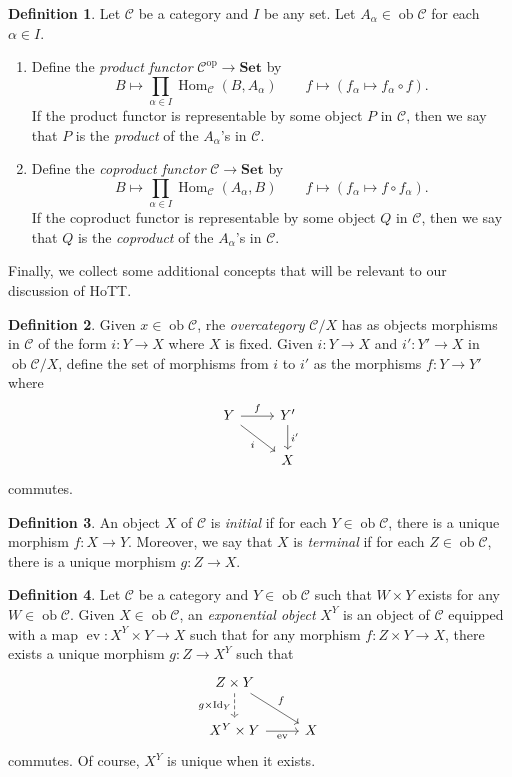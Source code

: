 \documentclass[10pt,letterpaper,cm]{nupset}
\theoremstyle{definition}
\newtheorem{definition}{Definition}[subsection]
\theoremstyle{theorem}
\theoremstyle{remark}
\newcommand{\1}{\mathbf{1}}
\renewcommand{\c}{\mathscr{C}}
\newcommand{\0}{\vec 0}
\DeclareMathOperator{\id}{Id}
\DeclareMathOperator{\op}{op}
\DeclareMathOperator{\ob}{ob}
\DeclareMathOperator{\ev}{ev}
\DeclareMathOperator{\Hom}{Hom}
\begin{document}
\begin{definition} Let $\c$ be a category and $I$ be any set. Let $A_{\alpha} \in \ob \c$ for each $\alpha \in I$.
\begin{enumerate}
\item  Define the \textit{product functor} $\c^{\op} \to \mathbf{Set}$ by $$B \mapsto \prod_{\alpha \in I}\Hom_{\c}(B, A_{\alpha}) \quad \quad f \mapsto (f_{\alpha} \mapsto f_{\alpha} \circ f).$$ If the product functor is representable by some object $P$ in $\c$, then we say that $P$ is the \textit{product} of the $A_{\alpha}$'s in $\c$.
\item Define the \textit{coproduct functor} $\c \to \mathbf{Set}$ by $$ B \mapsto \prod_{\alpha \in I} \Hom_{\c}(A_{\alpha}, B) \quad \quad f \mapsto (f_{\alpha} \mapsto f \circ f_{\alpha}).$$ If the coproduct functor is representable by some object $Q$ in $\c$, then we say that $Q$ is the \textit{coproduct} of the $A_{\alpha}$'s in $\c$.
\end{enumerate}
\end{definition}

Finally, we collect some additional concepts that will be relevant to our discussion of HoTT.

\begin{definition}
Given $x \in \ob \c$, rhe \textit{overcategory} ${\c}/{X}$ has as objects morphisms in $\c$ of the form $i : Y \to X$ where $X$ is fixed. Given $i:  Y \to X$ and  $i' : Y' \to X$ in $\ob {\c}/{X}$, define the set of morphisms from $i$ to $i'$ as the morphisms $f: Y \to Y'$ where
\[ \begin{tikzcd}
Y \arrow[r, "f"] \arrow[swap, dr,  " i "] & Y' \arrow[d, "i '"] \\%
 & X
\end{tikzcd}
\]
commutes.
\end{definition}

\begin{definition}
An object $X$ of $\c$ is \textit{initial} if for each $Y \in \ob \c$, there is a unique morphism $f : X \to Y$. Moreover, we say that $X$ is \textit{terminal} if for each $Z \in \ob \c$, there is a unique morphism $g : Z \to X$. 
\end{definition}

\begin{definition}
Let $\c$ be a category and $Y\in \ob{\c}$ such that $W\times Y$ exists for any $W\in \ob{\c}$. Given $X\in \ob{\c}$, an \textit{exponential object} $X^Y$ is an object of $\c$  equipped with a map $\ev : X^Y \times Y \to X$ such that for any morphism $f : Z\times Y \to X$, there exists a unique morphism $g: Z \to X^Y$ such that 
\[
\begin{tikzcd}
Z\times Y \arrow[d, "g\times \id_Y"', dashed] \arrow[rd, "f"] &  \\
X^Y \times Y \arrow[r, "\ev"'] & X
\end{tikzcd}
\] commutes. Of course, $X^Y$ is unique when it exists.
\end{definition}
\end{document}

